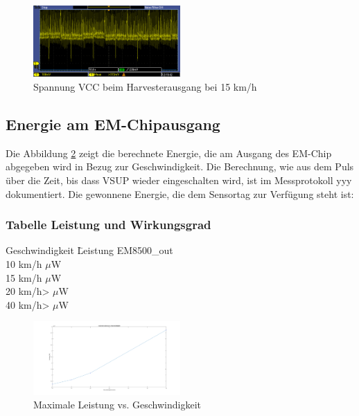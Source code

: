 \begin{figure}[ht]
    \includegraphics[width=0.5\textwidth]{4Resultate/imag/SpannungVCC.png} 
    \caption{Spannung VCC beim Harvesterausgang bei 15 km/h}
    \label{resultat_Harvester_Spannung}
\end{figure}

\newpage  %
\subsection{Energie am EM-Chipausgang}

Die Abbildung \ref{energie_resultat_harvester} zeigt die berechnete Energie, die am Ausgang des EM-Chip abgegeben wird in Bezug zur Geschwindigkeit. Die Berechnung, wie aus dem Puls über die Zeit, bis dass VSUP wieder eingeschalten wird, ist im  Messprotokoll yyy dokumentiert. Die gewonnene Energie, die dem Sensortag zur Verfügung steht ist:

\subsubsection*{Tabelle Leistung und Wirkungsgrad }
\begin{tabbing}
    Geschwindigkeit \quad\= Leistung EM8500\_out \\[0.8ex]
    10 km/h     $\mu$W\\
    15 km/h    $\mu$W\\
    20 km/h>   $\mu$W\\
    40 km/h>  $\mu$W\\
\end{tabbing}  


\begin{figure}[ht]
    \includegraphics[width=0.5\textwidth]{4Resultate/imag/ResultatLeistungGeschwindigkeit.png} 
    \caption{Maximale Leistung vs. Geschwindigkeit}
    \label{energie_resultat_harvester}
\end{figure}

